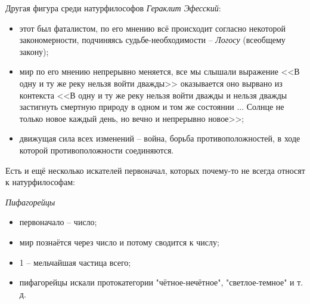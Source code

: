 Другая фигура среди натурфилософов \textit{Гераклит Эфесский}:
\begin{itemize}
	\itemsep-1ex
	\item этот был фаталистом, по его мнению всё происходит согласно некоторой закономерности, подчиняясь судьбе-необходимости -- \textit{Логосу} (всеобщему закону); 
	\item мир по его мнению непрерывно меняется, все мы слышали выражение <<В одну и ту же реку нельзя войти дважды>> оказывается оно вырвано из контекста <<В одну и ту же реку нельзя войти дважды и нельзя дважды застигнуть смертную природу в одном и том же состоянии ... Солнце не только новое каждый день, но вечно и непрерывно новое>>;
	\item движущая сила всех изменений -- война, борьба противоположностей, в ходе которой противоположности соединяются.
\end{itemize}

Есть и ещё несколько искателей первоначал, которых почему-то не всегда относят к натурфилософам:

\textit{Пифагорейцы}
\begin{itemize}
	\itemsep-1ex
	\item первоначало -- число; 
	\item мир познаётся через число и потому сводится к числу;
	\item 1 -- мельчайшая частица всего;
	\item пифагорейцы искали протокатегории "чётное-нечётное", "светлое-темное" и т. д.
\end{itemize}

